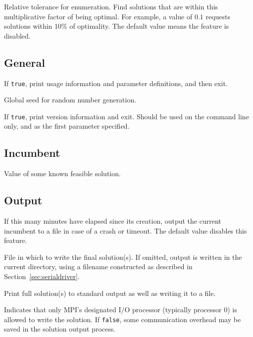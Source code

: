         Relative tolerance for enumeration.  Find solutions
        that are within this multiplicative factor of being
        optimal.  For example, a value of $0.1$ requests solutions
        within 10\% of optimality.  The default value means the
        feature is disabled.


\subsection{General}
\vspace{-3ex}
If \texttt{true}, print usage information and parameter definitions, and then exit.

Global seed for random number generation.

If \texttt{true}, print version information and exit. Should be used  on
the command line only, and as the first parameter specified.


\subsection{Incumbent}
\vspace{-3ex}
Value of some known feasible solution.

\subsection{Output}
\label{sec:outputparams}
\vspace{-3ex}
If this many minutes have elapsed since its creation,
output the current incumbent to a file in case of
a crash or timeout.  The default value disables this
feature.

File in which to write the final solution(s).  If omitted, output is
written in the current directory, using a filename constructed as
described in Section~\ref{sec:serialdriver}.

Print full solution(s) to standard output as well as writing it to a file.

 Indicates that only
MPI's designated I/O processor (typically processor 0) is allowed to
write the solution.  If \texttt{false}, some communication overhead
may be saved in the solution output process.

